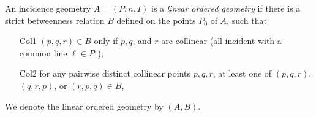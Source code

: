 \documentclass[12pt]{article}
\begin{document}
An incidence geometry $A=(P,n,I)$ is a
\emph{linear ordered geometry} if there is a strict betweenness
relation $B$ defined on the points $P_0$ of $A$, such that
\begin{itemize}
\item[Col1] $(p,q,r)\in B$ only if $p,q$, and $r$ are collinear (all incident with a common
line $\ell\in P_1$);
\item[Col2] for any pairwise distinct collinear points $p,q,r$, at least one of
$(p,q,r)$, $(q,r,p)$, or $(r,p,q)\in B$,
\end{itemize}
We denote the linear ordered geometry by $(A,B)$.\\
\end{document}
